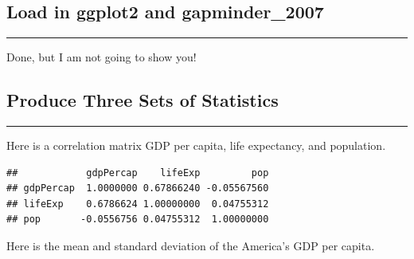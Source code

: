 \documentclass[
]{article}
\newenvironment{Shaded}{\begin{snugshade}}{\end{snugshade}}
\newcommand{\DecValTok}[1]{\textcolor[rgb]{0.00,0.00,0.81}{#1}}
\newcommand{\KeywordTok}[1]{\textcolor[rgb]{0.13,0.29,0.53}{\textbf{#1}}}
\newcommand{\NormalTok}[1]{#1}
\newcommand{\OperatorTok}[1]{\textcolor[rgb]{0.81,0.36,0.00}{\textbf{#1}}}
\newcommand{\StringTok}[1]{\textcolor[rgb]{0.31,0.60,0.02}{#1}}
\begin{document}
\hypertarget{load-in-ggplot2-and-gapminder_2007}{%
\subsection{Load in ggplot2 and
gapminder\_2007}\label{load-in-ggplot2-and-gapminder_2007}}

\begin{center}\rule{0.5\linewidth}{0.5pt}\end{center}

Done, but I am not going to show you!

\hypertarget{produce-three-sets-of-statistics}{%
\subsection{Produce Three Sets of
Statistics}\label{produce-three-sets-of-statistics}}

\begin{center}\rule{0.5\linewidth}{0.5pt}\end{center}

Here is a correlation matrix GDP per capita, life expectancy, and
population.

\begin{verbatim}
##            gdpPercap    lifeExp         pop
## gdpPercap  1.0000000 0.67866240 -0.05567560
## lifeExp    0.6786624 1.00000000  0.04755312
## pop       -0.0556756 0.04755312  1.00000000
\end{verbatim}

Here is the mean and standard deviation of the America's GDP per capita.

\begin{Shaded}
\end{Shaded}
\end{document}
